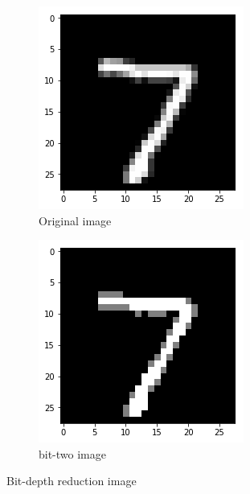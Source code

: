 \begin{figure}[ht!]
	\centering
	\begin{subfigure}{.35\textwidth}
		\includegraphics[width=\textwidth]{original7.png}
		\caption{Original image}
		\label{fig: bit-depth reduction 1}
	\end{subfigure}
	\begin{subfigure}{.35\textwidth}
		\includegraphics[width=\textwidth]{bit1-7.png}
		\caption{bit-two image}
		\label{fig: bit-depth reduction 8}
	\end{subfigure}
	\caption{Bit-depth reduction image}
\end{figure}

